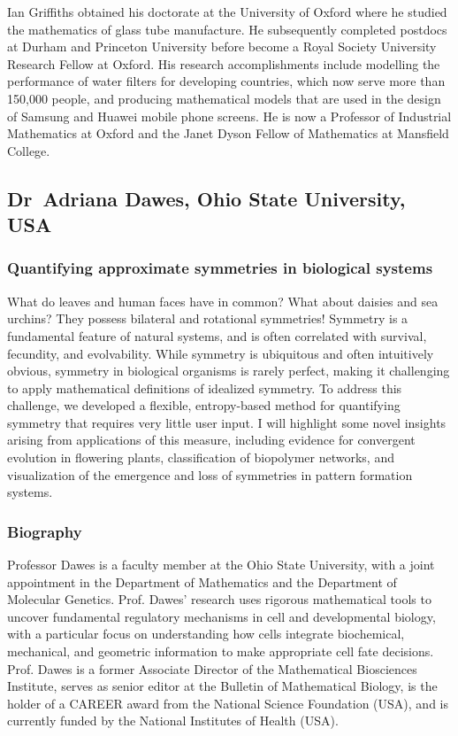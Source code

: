 \documentclass[12pt,a4paper]{article}
\begin{document}
Ian Griffiths obtained his doctorate at the University of Oxford where he studied the mathematics of glass tube manufacture. He subsequently completed postdocs at Durham and Princeton University before become a Royal Society University Research Fellow at Oxford. His research accomplishments include modelling the performance of water filters for developing countries, which now serve more than 150,000 people, and producing mathematical models that are used in the design of Samsung and Huawei mobile phone screens. He is now a Professor of Industrial Mathematics at Oxford and the Janet Dyson Fellow of Mathematics at Mansfield College.

\subsection{Dr~Adriana Dawes, Ohio State University, USA}

\subsubsection{Quantifying approximate symmetries in biological systems}

What do leaves and human faces have in common? What about daisies and sea urchins? They possess bilateral and rotational symmetries! Symmetry is a fundamental feature of natural systems, and is often correlated with survival, fecundity, and evolvability. While symmetry is ubiquitous and often intuitively obvious, symmetry in biological organisms is rarely perfect, making it challenging to apply mathematical definitions of idealized symmetry. To address this challenge, we developed a flexible, entropy-based method for quantifying symmetry that requires very little user input. I will highlight some novel insights arising from applications of this measure, including evidence for convergent evolution in flowering plants, classification of biopolymer networks, and visualization of the emergence and loss of symmetries in pattern formation systems.

\subsubsection{Biography}

Professor Dawes is a faculty member at the Ohio State University, with a joint appointment in the Department of Mathematics and the Department of Molecular Genetics. Prof. Dawes' research uses rigorous mathematical tools to uncover fundamental regulatory mechanisms in cell and developmental biology, with a particular focus on understanding how cells integrate biochemical, mechanical, and geometric information to make appropriate cell fate decisions. Prof. Dawes is a former Associate Director of the Mathematical Biosciences Institute, serves as senior editor at the Bulletin of Mathematical Biology, is the holder of a CAREER award from the National Science Foundation (USA), and is currently funded by the National Institutes of Health (USA).
\end{document}
